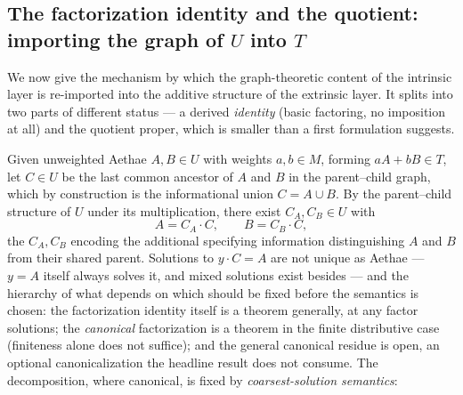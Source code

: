\subsection{The factorization identity and the quotient: importing the graph of $U$ into $T$}

We now give the mechanism by which the graph-theoretic content of the intrinsic layer is re-imported into the additive structure of the extrinsic layer. It splits into two parts of different status --- a derived \emph{identity} (basic factoring, no imposition at all) and the quotient proper, which is smaller than a first formulation suggests.

Given unweighted Aethae $A, B \in U$ with weights $a, b \in M$, forming $aA + bB \in T$, let $C \in U$ be the last common ancestor of $A$ and $B$ in the parent--child graph, which by construction is the informational union $C = A \cup B$. By the parent--child structure of $U$ under its multiplication, there exist $C_A, C_B \in U$ with
\begin{equation}
A = C_A \cdot C, \qquad B = C_B \cdot C,
\end{equation}
the $C_A, C_B$ encoding the additional specifying information distinguishing $A$ and $B$ from their shared parent. Solutions to $y \cdot C = A$ are not unique as Aethae --- $y = A$ itself always solves it, and mixed solutions exist besides --- and the hierarchy of what depends on which should be fixed before the semantics is chosen: the factorization identity itself is a theorem generally, at any factor solutions; the \emph{canonical} factorization is a theorem in the finite distributive case (finiteness alone does not suffice); and the general canonical residue is open, an optional canonicalization the headline result does not consume. The decomposition, where canonical, is fixed by \emph{coarsest-solution semantics}:

